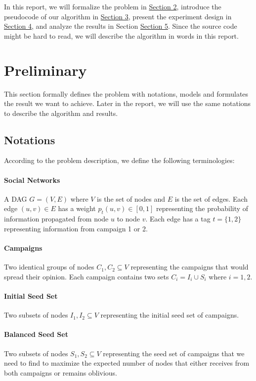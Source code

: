 \documentclass{article}
\begin{document}
In this report, we will formalize the problem in \hyperlink{section2}{Section 2}, introduce the pseudocode of our algorithm in \hyperlink{section3}{Section 3}, present the experiment design in \hyperlink{section4}{Section 4}, and analyze the results in Section \hyperlink{section5}{Section 5}. Since the source code might be hard to read, we will describe the algorithm in words in this report.

\section{Preliminary}
This section formally defines the problem with notations, models and formulates the result we want to achieve. Later in the report, we will use the same notations to describe the algorithm and results.

\subsection{Notations}
According to the problem description, we define the following terminologies:
\paragraph{Social Networks} A DAG $G = (V, E)$ where $V$ is the set of nodes and $E$ is the set of edges. Each edge $(u, v) \in E$ has a weight $p_t (u, v) \in [0, 1]$ representing the probability of information propagated from node $u$ to node $v$. Each edge has a tag $t = \{1, 2\}$ representing information from campaign 1 or 2.
\paragraph{Campaigns} Two identical groups of nodes $C_1, C_2 \subseteq V$ representing the campaigns that would spread their opinion. Each campaign contains two sets $C_i = I_i \cup S_i$ where $i = 1, 2$.
\paragraph{Initial Seed Set} Two subsets of nodes $I_1, I_2 \subseteq V$ representing the initial seed set of campaigns.
\paragraph{Balanced Seed Set} Two subsets of nodes $S_1, S_2 \subseteq V$ representing the seed set of campaigns that we need to find to maximize the expected number of nodes that either receives from both campaigns or remains oblivious.
\end{document}
